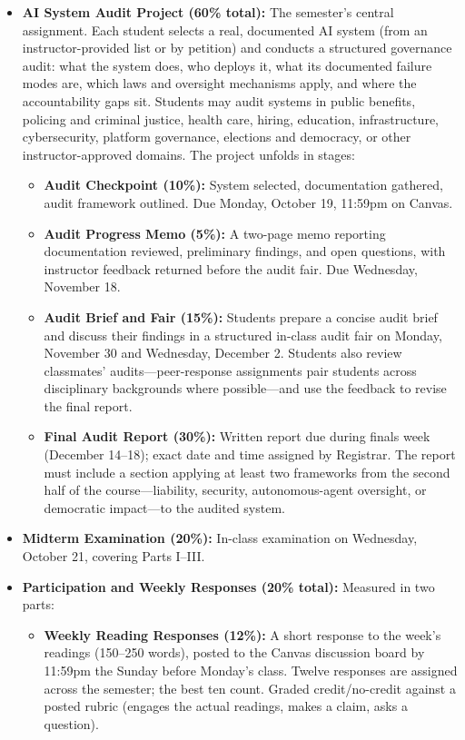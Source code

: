 \documentclass[12pt]{article}
\begin{document}
\begin{itemize}
    \item \textbf{AI System Audit Project (60\% total):} The semester's central assignment. Each student selects a real, documented AI system (from an instructor-provided list or by petition) and conducts a structured governance audit: what the system does, who deploys it, what its documented failure modes are, which laws and oversight mechanisms apply, and where the accountability gaps sit. Students may audit systems in public benefits, policing and criminal justice, health care, hiring, education, infrastructure, cybersecurity, platform governance, elections and democracy, or other instructor-approved domains. The project unfolds in stages:
    \begin{itemize}
        \item \textbf{Audit Checkpoint (10\%):} System selected, documentation gathered, audit framework outlined. Due Monday, October 19, 11:59pm on Canvas.
        \item \textbf{Audit Progress Memo (5\%):} A two-page memo reporting documentation reviewed, preliminary findings, and open questions, with instructor feedback returned before the audit fair. Due Wednesday, November 18.
        \item \textbf{Audit Brief and Fair (15\%):} Students prepare a concise audit brief and discuss their findings in a structured in-class audit fair on Monday, November 30 and Wednesday, December 2. Students also review classmates' audits---peer-response assignments pair students across disciplinary backgrounds where possible---and use the feedback to revise the final report.
        \item \textbf{Final Audit Report (30\%):} Written report due during finals week (December 14--18); exact date and time assigned by Registrar. The report must include a section applying at least two frameworks from the second half of the course---liability, security, autonomous-agent oversight, or democratic impact---to the audited system.
    \end{itemize}
    \item \textbf{Midterm Examination (20\%):} In-class examination on Wednesday, October 21, covering Parts I--III.
    \item \textbf{Participation and Weekly Responses (20\% total):} Measured in two parts:
    \begin{itemize}
        \item \textbf{Weekly Reading Responses (12\%):} A short response to the week's readings (150--250 words), posted to the Canvas discussion board by 11:59pm the Sunday before Monday's class. Twelve responses are assigned across the semester; the best ten count. Graded credit/no-credit against a posted rubric (engages the actual readings, makes a claim, asks a question).

\end{itemize}
\end{itemize}
\end{document}
